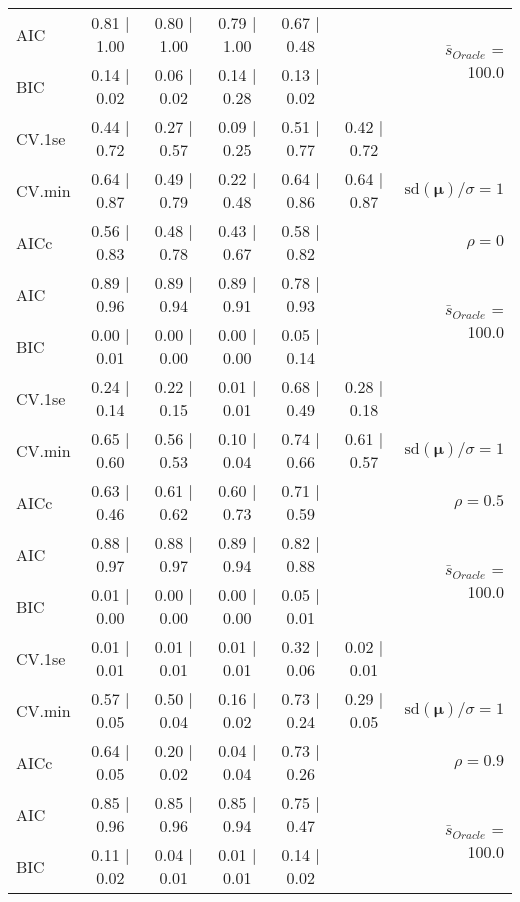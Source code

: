 \begin{table}
\begin{center}
\begin{tabular}{l*{5}{c}|r}
AIC & 0.81 $\mid$ 1.00 & 0.80 $\mid$ 1.00 & 0.79 $\mid$ 1.00 & 0.67 $\mid$ 0.48 & &  \multirow{2}{*}{$\bar{s}_{Oracle}$ = 100.0} \\
BIC & 0.14 $\mid$ 0.02 & 0.06 $\mid$ 0.02 & 0.14 $\mid$ 0.28 & 0.13 $\mid$ 0.02 & &  \\
 \hline 
CV.1se & 0.44 $\mid$ 0.72 & 0.27 $\mid$ 0.57 & 0.09 $\mid$ 0.25 & 0.51 $\mid$ 0.77 & 0.42 $\mid$ 0.72 & \\
CV.min & 0.64 $\mid$ 0.87 & 0.49 $\mid$ 0.79 & 0.22 $\mid$ 0.48 & 0.64 $\mid$ 0.86 & 0.64 $\mid$ 0.87 &  $\mathrm{sd}(\mathbf{\mu})/\sigma=1$ \\
AICc & 0.56 $\mid$ 0.83 & 0.48 $\mid$ 0.78 & 0.43 $\mid$ 0.67 & 0.58 $\mid$ 0.82 & & $\rho=0$ \\
AIC & 0.89 $\mid$ 0.96 & 0.89 $\mid$ 0.94 & 0.89 $\mid$ 0.91 & 0.78 $\mid$ 0.93 & &  \multirow{2}{*}{$\bar{s}_{Oracle}$ = 100.0} \\
BIC & 0.00 $\mid$ 0.01 & 0.00 $\mid$ 0.00 & 0.00 $\mid$ 0.00 & 0.05 $\mid$ 0.14 & &  \\
 \hline 
CV.1se & 0.24 $\mid$ 0.14 & 0.22 $\mid$ 0.15 & 0.01 $\mid$ 0.01 & 0.68 $\mid$ 0.49 & 0.28 $\mid$ 0.18 & \\
CV.min & 0.65 $\mid$ 0.60 & 0.56 $\mid$ 0.53 & 0.10 $\mid$ 0.04 & 0.74 $\mid$ 0.66 & 0.61 $\mid$ 0.57 &  $\mathrm{sd}(\mathbf{\mu})/\sigma=1$ \\
AICc & 0.63 $\mid$ 0.46 & 0.61 $\mid$ 0.62 & 0.60 $\mid$ 0.73 & 0.71 $\mid$ 0.59 & & $\rho=0.5$ \\
AIC & 0.88 $\mid$ 0.97 & 0.88 $\mid$ 0.97 & 0.89 $\mid$ 0.94 & 0.82 $\mid$ 0.88 & &  \multirow{2}{*}{$\bar{s}_{Oracle}$ = 100.0} \\
BIC & 0.01 $\mid$ 0.00 & 0.00 $\mid$ 0.00 & 0.00 $\mid$ 0.00 & 0.05 $\mid$ 0.01 & &  \\
 \hline 
CV.1se & 0.01 $\mid$ 0.01 & 0.01 $\mid$ 0.01 & 0.01 $\mid$ 0.01 & 0.32 $\mid$ 0.06 & 0.02 $\mid$ 0.01 & \\
CV.min & 0.57 $\mid$ 0.05 & 0.50 $\mid$ 0.04 & 0.16 $\mid$ 0.02 & 0.73 $\mid$ 0.24 & 0.29 $\mid$ 0.05 &  $\mathrm{sd}(\mathbf{\mu})/\sigma=1$ \\
AICc & 0.64 $\mid$ 0.05 & 0.20 $\mid$ 0.02 & 0.04 $\mid$ 0.04 & 0.73 $\mid$ 0.26 & & $\rho=0.9$ \\
AIC & 0.85 $\mid$ 0.96 & 0.85 $\mid$ 0.96 & 0.85 $\mid$ 0.94 & 0.75 $\mid$ 0.47 & &  \multirow{2}{*}{$\bar{s}_{Oracle}$ = 100.0} \\
BIC & 0.11 $\mid$ 0.02 & 0.04 $\mid$ 0.01 & 0.01 $\mid$ 0.01 & 0.14 $\mid$ 0.02 & &  \\

\end{tabular}
\end{center}
\end{table}
